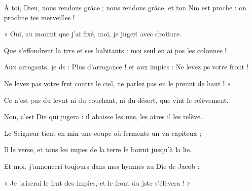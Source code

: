 \item À toi, Dieu, nous rendons grâce ;\pscross{} nous rendons grâce, et ton Nm est proche :\psstar{} on proclme tes merveilles !
\item « Oui, au momnt que j’ai fixé,\psstar{} moi, je jugeri avec droiture.
\item Que s’effondrent la trre et ses habitants :\psstar{} moi seul en ai pos les colonnes !
\item Aux arrogants, je ds : Plus d’arrogance !\psstar{} et aux impies : Ne levez ps votre front !
\item Ne levez pas votre frnt contre le ciel,\psstar{} ne parlez pas en le prennt de haut ! »
\item Ce n’est pas du levnt ni du couchant,\psstar{} ni du désert, que vint le relèvement.
\item Non, c’est Die qui jugera :\psstar{} il abaisse les uns, les atres il les relève.
\item Le Seigneur tient en min une coupe\psstar{} où fermente un vn capiteux ;
\item Il le verse, et tous les impes de la terre\psstar{} le boirnt jusqu’à la lie.
\item Et moi, j’annonceri toujours\psstar{} dans mes hymnes au Die de Jacob :
\item « Je briserai le frnt des impies,\psstar{} et le front du jste s’élèvera ! »